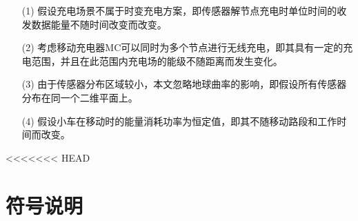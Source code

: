 \documentclass{whutmod}
\begin{document}
		\begin{itemize}  
		\item [(1)] 假设充电场景不属于时变充电方案，即传感器解节点充电时单位时间的收发数据能量不随时间改变而改变。
		\item [(2)] 考虑移动充电器MC可以同时为多个节点进行无线充电，即其具有一定的充电范围，并且在此范围内充电场的能级不随距离而发生变化。                 
		\item [(3)] 由于传感器分布区域较小，本文忽略地球曲率的影响，即假设所有传感器分布在同一个二维平面上。
		\item [(4)] 假设小车在移动时的能量消耗功率为恒定值，即其不随移动路段和工作时间而改变。

		\end{itemize}

		
<<<<<<< HEAD
	\section{符号说明}
\end{document}
